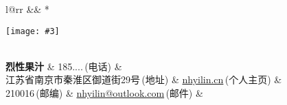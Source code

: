 \newcommand{\paint}[3]{
    \begin{minipage}{#1}
        \texttt{[image: \#3]}
    \end{minipage} 
}
\newcommand{\myheader}{
\begin{tabular*}{\textwidth}{l@{\extracolsep{\fill}}rr}
  && \multirow{4}*{\paint{2.31cm}{3.3cm}{./resume.jpg}}\\
  \specialrule{0em}{4pt}{4pt}
  \textbf{{\LARGE 烈性果汁}} & {185....}$\,${\color{labelgrey}(电话)} & \\
  江苏省南京市秦淮区御道街29号$\,${\color{labelgrey}(地址)} & \href{https://nhyilin.cn}{nhyilin.cn}$\,${\color{labelgrey}(个人主页)} & \\
  210016$\,${\color{labelgrey}(邮编)} & \href{mailto:nhyilin@outlook.com}{nhyilin@outlook.com}$\,${\color{labelgrey}(邮件)} & \\
  \end{tabular*}\\\vspace{0.1in}

}

\myheader

